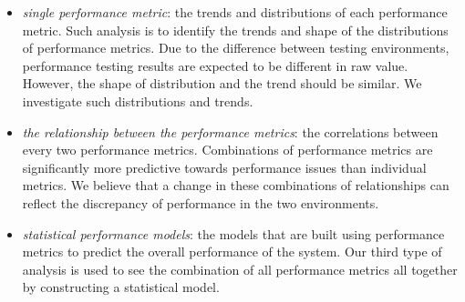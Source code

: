 \begin{itemize}
	\item \textit{single performance metric}: the trends and distributions of each performance metric. Such analysis is to identify the trends and shape of the distributions of performance metrics.
	Due to the difference between testing environments, performance testing results are expected to be
	different in raw value. However, the shape of distribution and the trend should be similar. We investigate such distributions and trends. 
	\item \textit{the relationship between the performance metrics}: the correlations between every two performance metrics. Combinations of performance metrics are significantly more predictive
	towards performance issues than individual metrics. We believe that a change in these combinations
	of relationships can reflect the discrepancy of performance in the two environments.
	\item \textit{statistical performance models}: the models that are built using performance metrics to predict the overall performance of the system. Our third type of analysis is used to see the combination of all performance metrics all together by
	constructing a statistical model.
	
\end{itemize}







